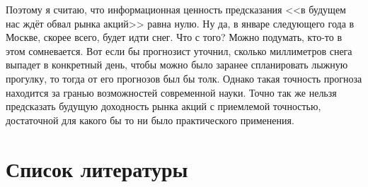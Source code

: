 Поэтому я считаю, что информационная ценность предсказания <<в будущем нас ждёт обвал рынка акций>> равна нулю. Ну да, в январе следующего года в Москве, скорее всего, будет идти снег. Что с того? Можно подумать, кто-то в этом сомневается. Вот если бы прогнозист уточнил, сколько миллиметров снега выпадет в конкретный день, чтобы можно было заранее спланировать лыжную прогулку, то тогда от его прогнозов был бы толк. Однако такая точность прогноза находится за гранью возможностей современной науки. Точно так же нельзя предсказать будущую доходность рынка акций с приемлемой точностью, достаточной для какого бы то ни было практического применения.

\section*{Список литературы}
\en{
\printbibliography[heading = none]
}


